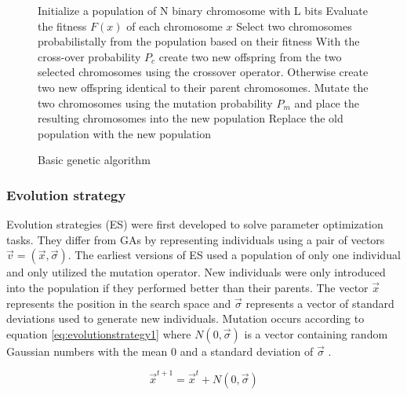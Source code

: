 \begin{figure}[h]
  \centering
  \begin{minipage}{12.5cm}
    \begin{algorithmic}
       \State Initialize a population of N binary chromosome with L bits
        \State Evaluate the fitness $F(x)$ of each chromosome $x$
        \Repeat
          \State Select two chromosomes probabilistally from the population
          \State based on their fitness
          \State With the cross-over probability $P_c$ create two new offspring
          \State from the two selected chromosomes using the crossover operator.
          \State Otherwise create two new offspring identical to their parent chromosomes.
          \State Mutate the two chromosomes using the mutation probability $P_m$
          \State and place the resulting chromosomes into the new population
        \State Replace the old population with the new population
       \EndWhile
    \end{algorithmic}
  \end{minipage}
  \caption{Basic genetic algorithm}
  \label{algo:geneticalgorithm}
\end{figure}

\subsubsection{Evolution strategy}

Evolution strategies (ES) were first developed to solve parameter optimization tasks. They differ from GAs by representing individuals using a pair of vectors $\vec{v} = (\vec{x},\vec{\sigma})$. The earliest versions of ES used a population of only one individual and only utilized the mutation operator. New individuals were only introduced into the population if they performed better than their parents. The vector $\vec{x}$ represents the position in the search space and $\vec{\sigma}$ represents a vector of standard deviations used to generate new individuals. Mutation occurs according to equation \ref{eq:evolutionstrategy1} where $N(0,\vec{\sigma})$ is a vector containing random Gaussian numbers with the mean $0$ and a standard deviation of $\vec{\sigma}$ \cite{Michalewicz1997}.

\begin{equation}
  \vec{x}^{t+1} =  \vec{x}^{t} + N(0,\vec{\sigma})
  \label{eq:evolutionstrategy1}
\end{equation}

